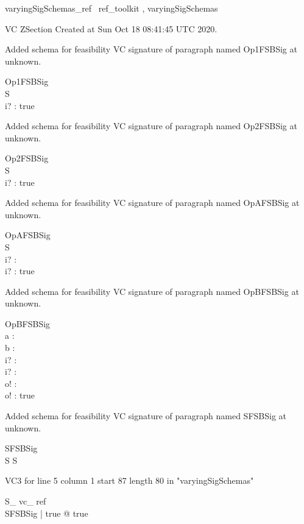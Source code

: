 \documentclass{article}
\begin{document}

\begin{zsection}	 \SECTION varyingSigSchemas\_ref \parents~ref\_toolkit , varyingSigSchemas
\end{zsection}

VC ZSection Created at Sun Oct 18 08:41:45 UTC 2020.


Added schema for feasibility VC signature of paragraph named Op1FSBSig at unknown.
\begin{schema}{Op1FSBSig}
\\
 S \\
 i? : \nat 
\where
 true
\end{schema}


Added schema for feasibility VC signature of paragraph named Op2FSBSig at unknown.
\begin{schema}{Op2FSBSig}
\\
 S \\
 i? : \nat 
\where
 true
\end{schema}


Added schema for feasibility VC signature of paragraph named OpAFSBSig at unknown.
\begin{schema}{OpAFSBSig}
\\
 S \\
 i? : \nat \\
 i? : \nat 
\where
 true
\end{schema}


Added schema for feasibility VC signature of paragraph named OpBFSBSig at unknown.
\begin{schema}{OpBFSBSig}
\\
 a : \nat \cap \nat \\
 b : \power \nat \cap \power \nat \\
 i? : \nat \\
 i? : \nat \\
 o! : \nat \\
 o! : \nat 
\where
 true
\end{schema}


Added schema for feasibility VC signature of paragraph named SFSBSig at unknown.
\begin{schema}{SFSBSig}
\\
 S 
\where
 S
\end{schema}

VC3 for line 5 column 1 start 87 length 80 in "varyingSigSchemas"
\begin{theorem}{ S\_ vc\_ ref}\\
 \exists SFSBSig | true @ true \\

\end{theorem}
\end{document}
